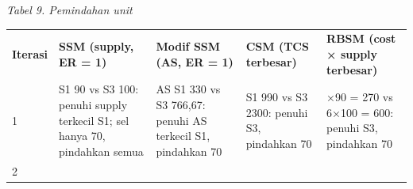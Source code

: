 \documentclass[10pt,a4paper]{article}
\newcounter{none}
\begin{document}
\emph{Tabel 9. Pemindahan unit}

{\def\LTcaptype{none} %
\begin{longtable}[]{@{}
  >{\raggedright\arraybackslash}p{}
  >{\raggedright\arraybackslash}p{}
  >{\raggedright\arraybackslash}p{}
  >{\raggedright\arraybackslash}p{}
  >{\raggedright\arraybackslash}p{}@{}}
\toprule\noalign{}
\begin{minipage}[b]{\linewidth}\raggedright
\textbf{Iterasi}
\end{minipage} & \begin{minipage}[b]{\linewidth}\centering
\textbf{SSM (supply, ER = 1)}
\end{minipage} & \begin{minipage}[b]{\linewidth}\centering
\textbf{Modif SSM (AS, ER = 1)}
\end{minipage} & \begin{minipage}[b]{\linewidth}\centering
\textbf{CSM (TCS terbesar)}
\end{minipage} & \begin{minipage}[b]{\linewidth}\centering
\textbf{RBSM (cost × supply terbesar)}
\end{minipage} \\
\begin{minipage}[b]{\linewidth}\raggedright
1
\end{minipage} & \begin{minipage}[b]{\linewidth}\centering
S1 90 vs S3 100: penuhi supply terkecil S1; sel hanya 70, pindahkan
semua
\end{minipage} & \begin{minipage}[b]{\linewidth}\centering
AS S1 330 vs S3 766,67: penuhi AS terkecil S1, pindahkan 70
\end{minipage} & \begin{minipage}[b]{\linewidth}\centering
S1 990 vs S3 2300: penuhi S3, pindahkan 70
\end{minipage} & \begin{minipage}[b]{\linewidth}\centering
3×90 = 270 vs 6×100 = 600: penuhi S3, pindahkan 70
\end{minipage} \\
\begin{minipage}[b]{\linewidth}\raggedright
2
\end{minipage} & \begin{minipage}[b]{\linewidth}\centering

\end{minipage}
\end{longtable}}
\end{document}
